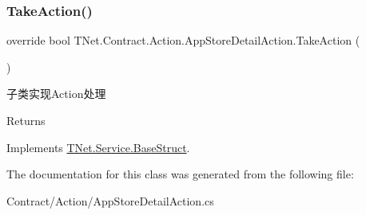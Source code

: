 \mbox{\label{class_t_net_1_1_contract_1_1_action_1_1_app_store_detail_action_a16a7cfa158cd14c46c4c665c49c7ded4}} 
\subsubsection{\texorpdfstring{Take\+Action()}{TakeAction()}}
{\footnotesize\ttfamily override bool T\+Net.\+Contract.\+Action.\+App\+Store\+Detail\+Action.\+Take\+Action (\begin{DoxyParamCaption}{ }\end{DoxyParamCaption})\hspace{0.3cm}{\ttfamily [virtual]}}



子类实现\+Action处理 

\begin{DoxyReturn}{Returns}

\end{DoxyReturn}


Implements \mbox{\hyperlink{class_t_net_1_1_service_1_1_base_struct_a5a1250b74d925d42066aebdefa36f54a}{T\+Net.\+Service.\+Base\+Struct}}.



The documentation for this class was generated from the following file\+:\begin{DoxyCompactItemize}
\item 
Contract/\+Action/App\+Store\+Detail\+Action.\+cs\end{DoxyCompactItemize}
